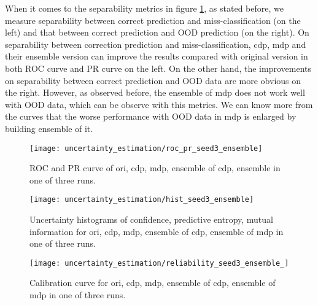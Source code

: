 When it comes to the separability metrics in figure \ref{exp2_roc_pr}, as stated before, we measure separability between correct prediction and miss-classification (on the left) and that between correct prediction and OOD prediction (on the right). On separability between correction prediction and miss-classification, cdp, mdp and their ensemble version can improve the results compared with original version in both ROC curve and PR curve on the left. On the other hand, the improvements on separability between correct prediction and OOD data are more obvious on the right. However, as observed before, the ensemble of mdp does not work well with OOD data, which can be observe with this metrics. We can know more from the curves that the worse performance with OOD data in mdp is enlarged by building ensemble of it.    

\begin{figure}[H]
	\begin{center}
		\texttt{[image: uncertainty\_estimation/roc\_pr\_seed3\_ensemble]}
		\caption{ROC and PR curve of ori, cdp, mdp, ensemble of cdp, ensemble in one of three runs.}		
		\label{exp2_roc_pr}
	\end{center} 
\end{figure}
\begin{figure}[H]
	\begin{center}
		\texttt{[image: uncertainty\_estimation/hist\_seed3\_ensemble]}
		\caption{Uncertainty histograms of confidence, predictive entropy, mutual information for ori, cdp, mdp, ensemble of cdp, ensemble of mdp in one of three runs.}		
		\label{exp2_histo}
	\end{center}
\end{figure}

\begin{figure}[H]
	\begin{center}
		\texttt{[image: uncertainty\_estimation/reliability\_seed3\_ensemble\_]}
		\caption{Calibration curve for ori, cdp, mdp, ensemble of cdp, ensemble of mdp in one of three runs.}		
		\label{exp2_reliability}
	\end{center}
\end{figure}


